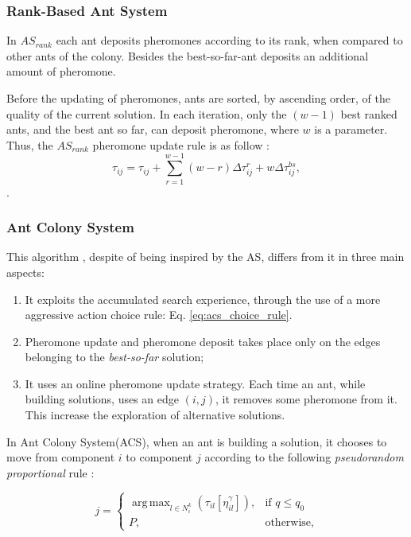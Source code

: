 					\subsubsection*{Rank-Based Ant System}

					In $AS_{rank}$ each ant deposits pheromones according to its rank, when compared to other ants of the colony. Besides the best-so-far-ant deposits an additional amount of pheromone.

					Before the updating of pheromones, ants are sorted, by ascending order, of the quality of the current solution. In each iteration, only the $(w-1)$ best ranked ants, and the best ant so far, can deposit pheromone, where $w$ is a parameter. Thus, the $AS_{rank}$ pheromone update rule is as follow \cite{bullnheimer97}:
					\begin{equation}
						\label{eq:asrank_pheromone_update}
						\tau_{ij} = \tau_{ij} + \sum_{r=1}^{w-1}(w-r)\Delta\tau_{ij}^r + w\Delta\tau_{ij}^{bs},
					\end{equation}.

					\subsubsection*{Ant Colony System}
					\label{sec:acs}
					This algorithm \cite{dorigo97}, despite of being inspired by the AS, differs from it in three main aspects:
					\begin{enumerate}
						\item It exploits the accumulated search experience, through the use of a more aggressive action choice rule: Eq. \ref{eq:acs_choice_rule}. 
						\item Pheromone update and pheromone deposit takes place only on the edges belonging to the \emph{best-so-far} solution;
						\item It uses an online pheromone update strategy. Each time an ant, while building solutions, uses an edge $(i,j)$, it removes some pheromone from it. This increase the exploration of alternative solutions.
					\end{enumerate}

					In Ant Colony System(ACS), when an ant is building a solution, it chooses to move from component $i$ to component $j$ according to the following \emph{pseudorandom proportional} rule \cite{dorigo97}:

					\begin{equation} 
						\label{eq:acs_choice_rule}
						j =
						  \begin{cases}
						   \operatorname{arg\,\max}_{l \in N_{i}^k} (\tau_{il}[\eta_{il}^{\gamma}]), & \text{if } q \leq q_{0}  \\
						  	P, & \text{otherwise,}
						  \end{cases}
					\end{equation}

